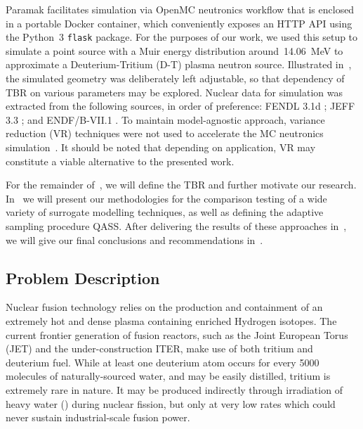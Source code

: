 Paramak facilitates simulation via OpenMC neutronics workflow that is enclosed in
a portable Docker container, which conveniently exposes an HTTP API using the
Python~3 \texttt{flask} package. For the purposes of our work, we used this setup to
simulate a point source with a Muir energy distribution \cite{openmcmuir}\footnotemark[1]
around~\SI{14.06}{\mega\electronvolt} to approximate a Deuterium-Tritium (D-T)
plasma neutron source. Illustrated in~, the simulated
geometry was deliberately left adjustable, so that dependency of TBR on various
parameters may be explored. Nuclear data for simulation was extracted from the following sources, in order of preference: FENDL 3.1d \cite{fendl31d}; JEFF 3.3 \cite{jeff33}; and ENDF/B-VII.1 \cite{2011ii}.
To maintain model-agnostic approach, variance reduction (VR) techniques
were not used to accelerate the MC neutronics simulation~\cite{Kleijnen2013}.
It should be noted that depending on application, VR may constitute a viable
alternative to the presented work.

For the remainder of~, we will define the TBR and further motivate our
research. In~ we will present our methodologies for the comparison
testing of a wide variety of surrogate modelling techniques, as well as defining the adaptive sampling procedure QASS. After delivering the
results of these approaches in~, we will give our final conclusions and
recommendations in~.



\subsection{Problem Description}
\label{sec:problemdescription}

Nuclear fusion technology relies on the production and containment of an
extremely hot and dense plasma containing enriched Hydrogen isotopes. The current frontier generation of fusion reactors, such as the Joint European Torus (JET) and the
under-construction ITER, make
use of both tritium and deuterium fuel. While at least one deuterium atom occurs for every \num{5000} molecules of naturally-sourced water, and may be easily distilled, tritium is extremely rare in nature. It may be produced indirectly through irradiation of heavy water
(\DDO) during nuclear fission, but only at very low rates which could
never sustain industrial-scale fusion power.

